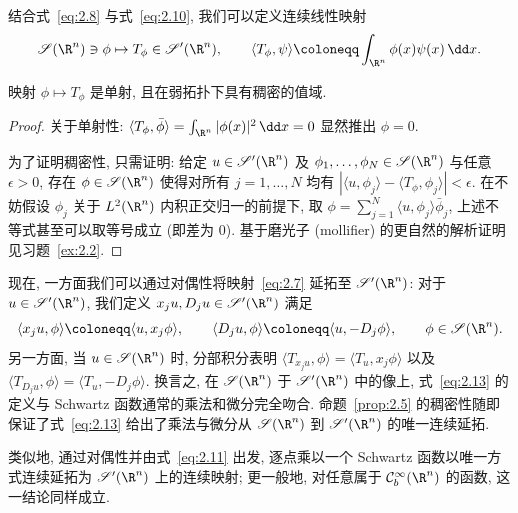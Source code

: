 结合式~\eqref{eq:2.8} 与式~\eqref{eq:2.10}, 我们可以定义连续线性映射
\begin{equation}\label{eq:2.12}
    \Schwartz(\R^n) \ni \phi \mapsto T_\phi \in \TempDistr(\R^n), \qquad \langle T_\phi, \psi \rangle \defeq \int_{\R^n} \phi(x)\psi(x) \,\dd x.
\end{equation}

\begin{proposition}[函数作为分布]\label{prop:2.5}
映射 $\phi \mapsto T_\phi$ 是单射, 且在弱拓扑下具有稠密的值域.
\end{proposition}

\begin{proof}
关于单射性: $\langle T_\phi, \bar{\phi} \rangle = \int_{\R^n} |\phi(x)|^2 \,\dd x = 0$ 显然推出 $\phi = 0$.

为了证明稠密性, 只需证明: 给定 $u \in \TempDistr(\R^n)$ 及 $\phi_1, \ldots, \phi_N \in \Schwartz(\R^n)$ 与任意 $\epsilon > 0$, 存在 $\phi \in \Schwartz(\R^n)$ 使得对所有 $j = 1, \ldots, N$ 均有 $|\langle u, \phi_j \rangle - \langle T_\phi, \phi_j \rangle| < \epsilon$. 在不妨假设 $\phi_j$ 关于 $L^2(\R^n)$ 内积正交归一的前提下, 取 $\phi = \sum_{j=1}^N \langle u, \phi_j \rangle \bar{\phi}_j$, 上述不等式甚至可以取等号成立 (即差为 $0$). 基于磨光子 (mollifier) 的更自然的解析证明见习题~\ref{ex:2.2}.
\end{proof}

现在, 一方面我们可以通过对偶性将映射~\eqref{eq:2.7} 延拓至 $\TempDistr(\R^n)$: 对于 $u \in \TempDistr(\R^n)$, 我们定义 $x_j u, D_j u \in \TempDistr(\R^n)$ 满足
\begin{equation}\label{eq:2.13}
    \langle x_j u, \phi \rangle \defeq \langle u, x_j \phi \rangle, \qquad \langle D_j u, \phi \rangle \defeq \langle u, -D_j \phi \rangle, \qquad \phi \in \Schwartz(\R^n).
\end{equation}
另一方面, 当 $u \in \Schwartz(\R^n)$ 时, 分部积分表明 $\langle T_{x_j u}, \phi \rangle = \langle T_u, x_j \phi \rangle$ 以及 $\langle T_{D_j u}, \phi \rangle = \langle T_u, -D_j \phi \rangle$. 换言之, 在 $\Schwartz(\R^n)$ 于 $\TempDistr(\R^n)$ 中的像上, 式~\eqref{eq:2.13} 的定义与 Schwartz 函数通常的乘法和微分完全吻合. 命题~\ref{prop:2.5} 的稠密性随即保证了式~\eqref{eq:2.13} 给出了乘法与微分从 $\Schwartz(\R^n)$ 到 $\TempDistr(\R^n)$ 的唯一连续延拓.

类似地, 通过对偶性并由式~\eqref{eq:2.11} 出发, 逐点乘以一个 Schwartz 函数以唯一方式连续延拓为 $\TempDistr(\R^n)$ 上的连续映射; 更一般地, 对任意属于 $\mathcal{C}_b^\infty(\R^n)$ 的函数, 这一结论同样成立.

